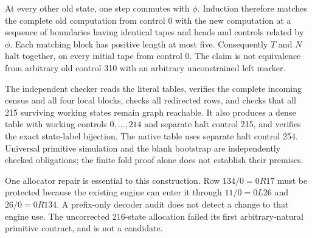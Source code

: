 At every other old state, one step commutes with $\phi$. Induction therefore
matches the complete old computation from control 0 with the new computation
at a sequence of boundaries having identical tapes and heads and controls
related by $\phi$. Each matching block has positive length at most five.
Consequently $T$ and $N$ halt together, on every initial tape from control 0.
The claim is not equivalence from arbitrary old control 310 with an arbitrary
unconstrained left marker.

The independent checker reads the literal tables, verifies the complete
incoming census and all four local blocks, checks all redirected rows, and
checks that all 215 surviving working states remain graph reachable. It also
produces a dense table with working controls $0,\ldots,214$ and separate halt
control 215, and verifies the exact state-label bijection. The native table
uses separate halt control 254. Universal primitive simulation and the blank
bootstrap are independently checked obligations; the finite fold proof alone
does not establish their premises.

One allocator repair is essential to this construction. Row $134/0=0R17$
must be protected because the existing engine can enter it through
$11/0=0L26$ and $26/0=0R134$. A prefix-only decoder audit does not detect a
change to that engine use. The uncorrected 216-state allocation failed its
first arbitrary-natural primitive contract, and is not a candidate.
